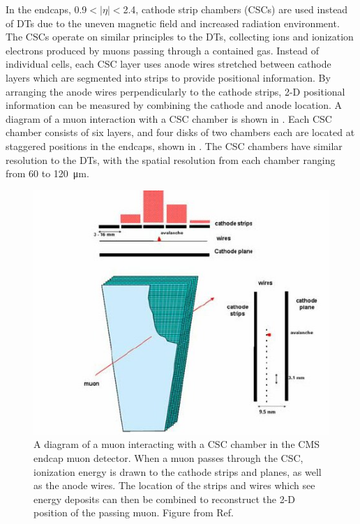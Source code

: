 In the endcaps, 0.9$<\lvert\eta\rvert<$2.4, cathode strip chambers (CSCs) are used instead of DTs due to the uneven magnetic field and increased radiation environment.
The CSCs operate on similar principles to the DTs, collecting ions and ionization electrons produced by muons passing through a contained gas. 
Instead of individual cells, each CSC layer uses anode wires stretched between cathode layers which are segmented into strips to provide positional information. 
By arranging the anode wires perpendicularly to the cathode strips, 2-D positional information can be measured by combining the cathode and anode location. 
A diagram of a muon interaction with a CSC chamber is shown in .
Each CSC chamber consists of six layers, and four disks of two chambers each are located at staggered positions in the endcaps, shown in . 
The CSC chambers have similar resolution to the DTs, with the spatial resolution from each chamber ranging from 60 to \SI{120}{\micro\meter}.

\begin{figure}[ht]
    \includegraphics[width=\textwidth]{figures/cscInteractionExample.jpg}
    \centering
	\caption[A muon interacting with a CSC chamber]{A diagram of a muon interacting with a CSC chamber in the CMS endcap muon detector. When a muon passes through the CSC, ionization energy is drawn to the cathode strips and planes, as well as the anode wires. The location of the strips and wires which see energy deposits can then be combined to reconstruct the 2-D position of the passing muon. Figure from Ref. \cite{hauser2004}}
    \label{fig:CSCInteraction}
\end{figure}


